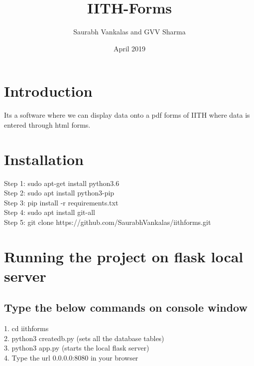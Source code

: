 \documentclass[journal,12pt,twocolumn]{IEEEtran}
\title{IITH-Forms}
\author{ Saurabh Vankalas and GVV Sharma}
\date{April 2019}
\begin{document}
\maketitle

\section {\textbf{Introduction}}
Its a software where we can display data onto a pdf forms of IITH where data is entered through html forms.
\section {\textbf{Installation}}
\begin{flushleft}
Step 1: sudo apt-get install python3.6 \\
Step 2: sudo apt install python3-pip \\
Step 3: pip install -r requirements.txt \\
Step 4: sudo apt install git-all \\
Step 5: git clone https://github.com/SaurabhVankalas/iithforms.git \\
\end{flushleft}
\section {\textbf{Running the project on flask local server}}

\subsection{\textbf{Type the below commands on console window}}
\begin{flushleft}
1. cd iithforms \\
2. python3 createdb.py (sets all the database tables)\\
3. python3 app.py (starts the local flask server) \\
4. Type the url 0.0.0.0:8080 in your browser \\
\end{flushleft}
\end{document}
